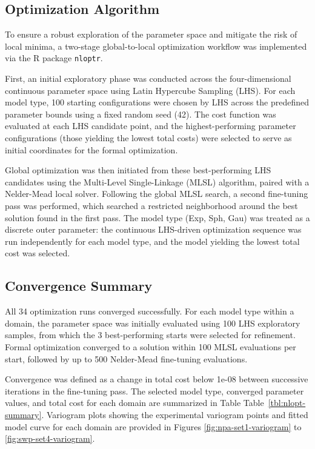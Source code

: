 \documentclass[final]{agujournal2019}
\begin{document}
\subsection*{Optimization Algorithm}\label{sec:optimization-algorithm}

To ensure a robust exploration of the parameter space and mitigate the
risk of local minima, a two-stage global-to-local optimization workflow
was implemented via the R package \texttt{nloptr}.

First, an initial exploratory phase was conducted across the
four-dimensional continuous parameter space using Latin Hypercube
Sampling (LHS). For each model type, 100 starting configurations were
chosen by LHS across the predefined parameter bounds using a fixed
random seed (42). The cost function was evaluated at each LHS candidate
point, and the highest-performing parameter configurations (those
yielding the lowest total costs) were selected to serve as initial
coordinates for the formal optimization.

Global optimization was then initiated from these best-performing LHS
candidates using the Multi-Level Single-Linkage (MLSL) algorithm, paired
with a Nelder-Mead local solver. Following the global MLSL search, a
second fine-tuning pass was performed, which searched a restricted
neighborhood around the best solution found in the first pass. The model
type (Exp, Sph, Gau) was treated as a discrete outer parameter: the
continuous LHS-driven optimization sequence was run independently for
each model type, and the model yielding the lowest total cost was
selected.

\subsection*{Convergence Summary}\label{sec:convergence-summary}

All 34 optimization runs converged successfully. For each model type
within a domain, the parameter space was initially evaluated using 100
LHS exploratory samples, from which the 3 best-performing starts were
selected for refinement. Formal optimization converged to a solution
within 100 MLSL evaluations per start, followed by up to 500 Nelder-Mead
fine-tuning evaluations.

Convergence was defined as a change in total cost below 1e-08 between
successive iterations in the fine-tuning pass. The selected model type,
converged parameter values, and total cost for each domain are
summarized in Table Table~\ref{tbl:nlopt-summary}. Variogram plots
showing the experimental variogram points and fitted model curve for
each domain are provided in Figures \ref{fig:npa-set1-variogram} to
\ref{fig:swp-set4-variogram}.
\end{document}
